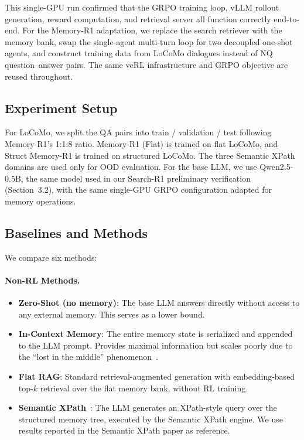 \documentclass{article}
\theoremstyle{definition}
\begin{document}
This single-GPU run confirmed that the GRPO training loop, vLLM rollout generation, reward computation, and retrieval server all function correctly end-to-end. For the Memory-R1 adaptation, we replace the search retriever with the memory bank, swap the single-agent multi-turn loop for two decoupled one-shot agents, and construct training data from LoCoMo dialogues instead of NQ question--answer pairs. The same veRL infrastructure and GRPO objective are reused throughout.




\subsection{Experiment Setup}

For LoCoMo, we split the QA pairs into train / validation / test following Memory-R1's 1:1:8 ratio. Memory-R1 (Flat) is trained on flat LoCoMo, and Struct Memory-R1 is trained on structured LoCoMo. The three Semantic XPath domains are used only for OOD evaluation. For the base LLM, we use Qwen2.5-0.5B, the same model used in our Search-R1 preliminary verification (Section~3.2), with the same single-GPU GRPO configuration adapted for memory operations.

\subsection{Baselines and Methods}

We compare six methods:

\paragraph{Non-RL Methods.}
\begin{itemize}[nosep]
    \item \textbf{Zero-Shot (no memory)}: The base LLM answers directly without access to any external memory. This serves as a lower bound.
    \item \textbf{In-Context Memory}: The entire memory state is serialized and appended to the LLM prompt. Provides maximal information but scales poorly due to the ``lost in the middle'' phenomenon~\citep{liu2024lost}.
    \item \textbf{Flat RAG}: Standard retrieval-augmented generation with embedding-based top-$k$ retrieval over the flat memory bank, without RL training.
    \item \textbf{Semantic XPath}~\citep{semanticxpath2026}: The LLM generates an XPath-style query over the structured memory tree, executed by the Semantic XPath engine. We use results reported in the Semantic XPath paper as reference.
\end{itemize}
\end{document}
